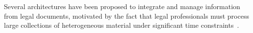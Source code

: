 








Several architectures have been proposed to integrate and manage information from legal documents, motivated by the fact that legal professionals must process large collections of heterogeneous material under significant time constraints~\cite{bellandi2025streamlining,breit_legal_permits_2020,beniamino_strada_2022,HAN2024121052legalasst,human-ai-system-legal-precedent-search-china}.

